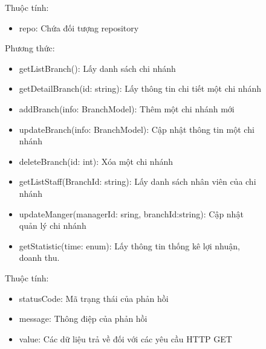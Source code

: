 \begin{figure}[!htp]
Thuộc tính:
\begin{itemize}
	\item repo: Chứa đối tượng repository
\end{itemize}
Phương thức:
\begin{itemize}
	\item getListBranch(): Lấy danh sách chi nhánh
	\item getDetailBranch(id: string): Lấy thông tin chi tiết một chi nhánh
	\item addBranch(info: BranchModel): Thêm một chi nhánh mới
	\item updateBranch(info: BranchModel): Cập nhật thông tin một chi nhánh
	\item deleteBranch(id: int): Xóa một chi nhánh
	\item getListStaff(BranchId: string): Lấy danh sách nhân viên của chi nhánh
	\item updateManger(managerId: sring, branchId:string): Cập nhật quản lý chi nhánh
	\item getStatistic(time: enum): Lấy thông tin thống kê lợi nhuận, doanh thu.
\end{itemize}

Thuộc tính:
\begin{itemize}
	\item statusCode: Mã trạng thái của phản hồi
	\item message: Thông điệp của phản hồi
	\item value: Các dữ liệu trả về đối với các yêu cầu HTTP GET
\end{itemize}



\end{figure}
